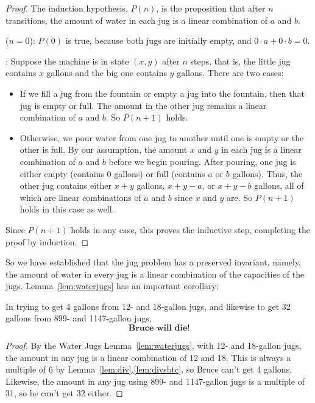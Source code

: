 \begin{proof}
The induction hypothesis, $P(n)$, is the proposition that after $n$
transitions, the amount of water in each jug is a linear combination
of $a$ and $b$.

 ($n = 0$): $P(0)$ is true, because both jugs are initially empty,
and $0 \cdot a + 0 \cdot b = 0$.

: Suppose the machine is in state
$(x,y)$ after $n$ steps, that is, the little jug contains $x$ gallons
and the big one contains $y$ gallons.  There are two cases:

\begin{itemize}

\item If we fill a jug from the fountain or empty a jug into the
  fountain, then that jug is empty or full.  The amount in the other
  jug remains a linear combination of $a$ and $b$.  So $P(n+1)$ holds.

\item Otherwise, we pour water from one jug to another until one is
  empty or the other is full.  By our assumption, the amount $x$ and
  $y$ in each jug is a linear combination of $a$ and $b$ before we
  begin pouring.  After pouring, one jug is either empty (contains 0
  gallons) or full (contains $a$ or $b$ gallons).  Thus, the other jug
  contains either $x + y$ gallons, $x + y - a$, or $x + y - b$
  gallons, all of which are linear combinations of $a$ and $b$ since
  $x$ and $y$ are.  So $P(n+1)$ holds in this case as well.
\end{itemize}
Since $P(n+1)$ holds in any case, this proves the inductive step, completing the proof by
induction.
\end{proof}

So we have established that the jug problem has a preserved invariant,
namely, the amount of water in every jug is a linear combination of
the capacities of the jugs.  Lemma~\ref{lem:waterjugs} has an
important corollary:
\begin{corollary*}
In trying to get 4 gallons from 12- and 18-gallon jugs, and likewise
to get 32 gallons from 899- and 1147-gallon jugs,
\[
\textbf{Bruce will die!}
\]
\end{corollary*}

\begin{proof}
By the Water Jugs Lemma~\ref{lem:waterjugs}, with 12- and 18-gallon
jugs, the amount in any jug is a linear combination of 12 and 18.
This is always a multiple of 6 by
Lemma~\ref{lem:div}.\ref{lem:divsbtc}, so Bruce can't get 4 gallons.
Likewise, the amount in any jug using 899- and 1147-gallon jugs is a
multiple of 31, so he can't get 32 either.
\end{proof}

